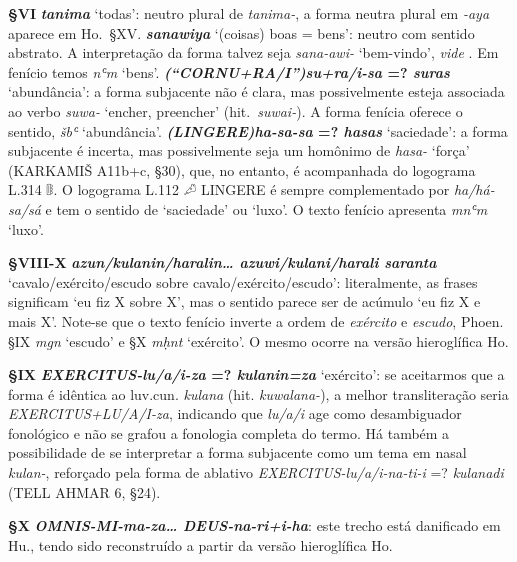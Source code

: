 \smallskip
\noindent\textbf{§VI}\tabto{2em}
\textbf{\emph{tanima}} `todas': neutro plural de \emph{tanima-}, a forma neutra
plural em \emph{-aya} aparece em Ho.\ §XV\@.
\textbf{\emph{sanawiya}} `(coisas) boas = bens': neutro com sentido abstrato. A
interpretação da forma talvez seja \emph{sana-awi-} `bem-vindo', \emph{vide}
\citet{YakubovichWelcome}. Em fenício temos \emph{nʿm} `bens'.
\textbf{\emph{\emph{(“CORNU+RA/I”)}su+ra/i-sa} {=?} \emph{suras}} `abundância':
a forma subjacente não é cla\-ra, mas possivelmente esteja associada ao verbo
\emph{suwa-} `encher, preencher' (hit.\ \emph{suwai-}). A forma fenícia oferece o
sentido, \emph{šbʿ} `abundância'.
\textbf{\emph{\emph{(LINGERE)}ha-sa-sa} {=?} \emph{hasas}} `saciedade': a forma
subjacente é incerta, mas possivel\-mente seja um homônimo de \emph{hasa-} `força'
(KARKAMIŠ A11b+c, §30), que, no entanto, é acompanhada do logograma L.314 𔕡.
O logograma L.112 𔒈 LINGERE é sempre complementado por \emph{ha/há-sa/sá} e tem
o sentido de `saciedade' ou `luxo'.
O texto fenício apresenta \emph{mnʿm} `luxo'.

\smallskip
\noindent\textbf{§VIII-X}\tabto{4em}
\textbf{\emph{azun\slash{}kulanin\slash{}haralin\ldots{}
		azuwi\slash{}kulani\slash{}harali saranta}}
`cavalo\slash{}exér\-ci\-to\slash{}escudo sobre cavalo\slash{}exército\slash{}escudo':
literalmente, as frases significam `eu fiz X sobre X', mas o sentido parece ser
de acúmulo `eu fiz X e mais X'.
Note-se que o texto fenício inverte a ordem de \emph{exército} e \emph{escudo},
Phoen. §IX \emph{mgn} `escudo' e §X \emph{mḥnt} `exército'.
O mesmo ocorre na versão hieroglífica Ho.

\smallskip
\noindent\textbf{§IX}\tabto{2em}
\textbf{\emph{\emph{EXERCITUS}-lu/a/i-za} {=?} \emph{kulanin=za}} `exército': se
aceitarmos que a for\-ma é idêntica ao luv.cun. \emph{kulana} (hit.
\emph{kuwalana-}), a melhor transliteração seria
\emph{\emph{EXERCITUS}+LU/A/I-za}, indicando que \emph{lu/a/i} age como
desambiguador fonológico e não se grafou a fonologia completa do termo.
Há também a possibilidade de se interpretar a forma subjacente como um tema em
nasal \emph{kulan-}, reforçado pela forma de ablativo
\emph{\emph{EXERCITUS}-lu/a/i-na-ti-i} {=?} \emph{kulanadi} (TELL AHMAR 6,
§24).

\smallskip
\noindent\textbf{§X}\tabto{2em}
\textbf{\emph{\emph{OMNIS}-MI-ma-za\ldots{} \emph{DEUS}-na-ri+i-ha}}: este trecho
está danificado em Hu., tendo sido reconstruído a partir da versão hieroglífica Ho.

